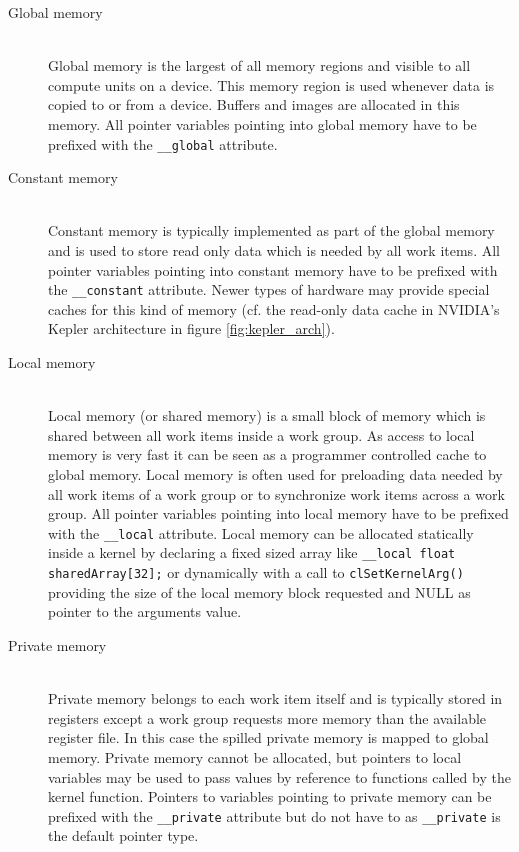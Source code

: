 \begin{description}
	\item[Global memory] \hfill \\
	Global memory is the largest of all memory regions and visible to all compute units on a device. This memory region is used whenever data is copied to or from a device. Buffers and images are allocated in this memory. All pointer variables pointing into global memory have to be prefixed with the \lstinline!__global! attribute. \cite[p.29]{opencl_book}
	
	\item[Constant memory] \hfill \\
	Constant memory is typically implemented as part of the global memory and is used to store read only data which is needed by all work items. All pointer variables pointing into constant memory have to be prefixed with the \lstinline!__constant! attribute. \cite[p.30]{opencl_book} Newer types of hardware may provide special caches for this kind of memory (cf. the read-only data cache in NVIDIA's Kepler architecture in figure \ref{fig:kepler_arch}). \cite[p.30]{opencl_book}
	
	\item[Local memory] \hfill \\
	Local memory (or shared memory) is a small block of memory which is shared between all work items inside a work group. As access to local memory is very fast it can be seen as a programmer controlled cache to global memory. Local memory is often used for preloading data needed by all work items of a work group or to synchronize work items across a work group. All pointer variables pointing into local memory have to be prefixed with the \lstinline!__local! attribute. Local memory can be allocated statically inside a kernel by declaring a fixed sized array like \lstinline!__local float sharedArray[32];! or dynamically with a call to \lstinline!clSetKernelArg()! providing the size of the local memory block requested and NULL as pointer to the arguments value. \cite[p.30]{opencl_book}

	\item[Private memory] \hfill \\
	Private memory belongs to each work item itself and is typically stored in registers except a work group requests more memory than the available register file. In this case the spilled private memory is mapped to global memory. Private memory cannot be allocated, but pointers to local variables may be used to pass values by reference to functions called by the kernel function. Pointers to variables pointing to private memory can be prefixed with the \lstinline!__private! attribute but do not have to as \lstinline!__private! is the default pointer type. \cite[p.30]{opencl_book}
	
\end{description}

